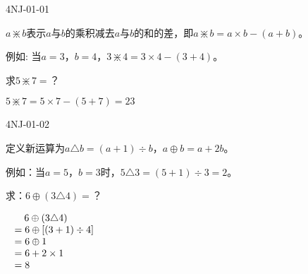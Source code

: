 

\begin{defproblem}{4NJ-01-01}%
\begin{onlyproblem}%
$a\divideontimes b$表示$a$与$b$的乘积减去$a$与$b$的和的差，即$a\divideontimes b=a\times b-(a+b)$。
 
例如: 当$a=3$，$b=4$，$3\divideontimes 4=3\times 4-(3+4)$。 
  
求$5\divideontimes 7=$？

\end{onlyproblem}%
\begin{onlysolution}%
$5\divideontimes 7=5\times7-(5+7)=23$
\end{onlysolution}%
\end{defproblem}


\begin{defproblem}{4NJ-01-02}%
\begin{onlyproblem}%
定义新运算为$a\triangle b=(a+1)\div b$，$a\oplus b=a+2b$。

例如：当$a=5$，$b=3$时，$5\triangle 3=(5+1)\div 3=2$。 

求：$6\oplus (3\triangle 4)=$？ 

\end{onlyproblem}%
\begin{onlysolution}%
$\begin{array}[t]{r@{~}l}
&\quad6\oplus (3\triangle 4)\\
&=6\oplus [(3+1)\div4]\\
&=6\oplus1\\
&=6+2\times1\\
&=8
\end{array}
$

\end{onlysolution}%
\end{defproblem}


